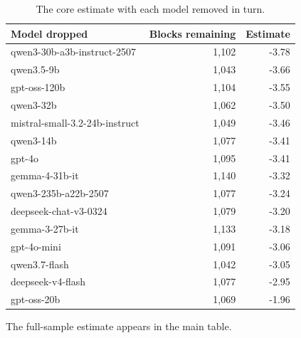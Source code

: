 \begin{table}[t]
\centering
\caption{The core estimate with each model removed in turn.}
\label{tab:loo}
\small
\begin{tabular}{lrr}
\toprule
Model dropped & Blocks remaining & Estimate \\
\midrule
qwen3-30b-a3b-instruct-2507 & 1,102 & -3.78 \\
qwen3.5-9b & 1,043 & -3.66 \\
gpt-oss-120b & 1,104 & -3.55 \\
qwen3-32b & 1,062 & -3.50 \\
mistral-small-3.2-24b-instruct & 1,049 & -3.46 \\
qwen3-14b & 1,077 & -3.41 \\
gpt-4o & 1,095 & -3.41 \\
gemma-4-31b-it & 1,140 & -3.32 \\
qwen3-235b-a22b-2507 & 1,077 & -3.24 \\
deepseek-chat-v3-0324 & 1,079 & -3.20 \\
gemma-3-27b-it & 1,133 & -3.18 \\
gpt-4o-mini & 1,091 & -3.06 \\
qwen3.7-flash & 1,042 & -3.05 \\
deepseek-v4-flash & 1,077 & -2.95 \\
gpt-oss-20b & 1,069 & -1.96 \\
\bottomrule
\end{tabular}
\vspace{2pt}
\parbox{\linewidth}{\footnotesize The full-sample estimate appears in the main table.}
\end{table}

